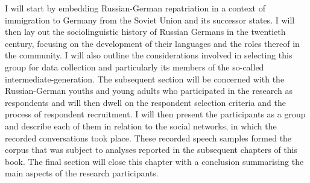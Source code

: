 I will start by embedding Russian-German repatriation in a context of immigration to Germany from the Soviet Union and its successor states. I will then lay out the sociolinguistic history of Russian Germans in the twentieth century, focusing on the development of their languages and the roles thereof in the community. I will also outline the considerations involved in selecting this group for data collection and particularly its members of the so-called intermediate-generation. The subsequent section will be concerned with the Russian-German youths and young adults who participated in the research as respondents and will then dwell on the respondent selection criteria and the process of respondent recruitment. I will then present the participants as a group and describe each of them in relation to the social networks, in which the recorded conversations took place. These recorded speech samples formed the corpus that was subject to analyses reported in the subsequent chapters of this book. The final section will close this chapter with a conclusion summarising the main aspects of the research participants.

